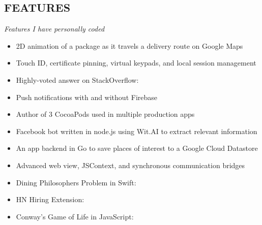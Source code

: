 \documentclass[margin]{res}
\begin{document}
\begin{resume}
\section{FEATURES}   
	{\sl Features I have personally coded}    
		\begin{itemize}    \itemsep -2pt %
		\renewcommand\labelitemi{\tiny$\blacksquare$}
			\item 2D animation of a package as it travels a delivery route on Google Maps
			\item Touch ID, certificate pinning, virtual keypads, and local session management
			\item Highly-voted answer on StackOverflow: \hfill{}
			\item Push notifications with and without Firebase
			\item Author of 3 CocoaPods used in multiple production apps
			\item Facebook bot written in node.js using Wit.AI to extract relevant information
			\item An app backend in Go to save places of interest to a Google Cloud Datastore
			\item Advanced web view, JSContext, and synchronous communication bridges
			\item Dining Philosophers Problem in Swift: \hfill{}
	    		\item HN Hiring Extension: \hfill{}
	    		\item Conway's Game of Life in JavaScript: \hfill{}
                	\end{itemize}
	
\end{resume}
\end{document}
